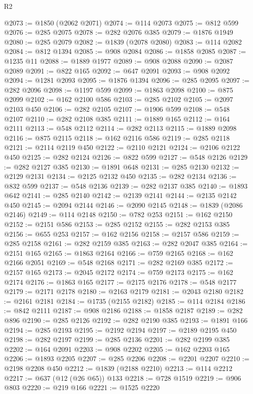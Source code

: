 \begin{lexlean}{R2}
\begin{coremodule}
@2073 := @1850 (@2062 @2071)
@2074 := @114 @2073
@2075 := @812 @599
@2076 := @285 @2075
@2078 := @282 @2076 @385
@2079 := @1876 @1949
@2080 := @285 @2079
@2082 := @1839 (@2078 @2080)
@2083 := @114 @2082
@2084 := @812 @1394
@2085 := @908 @2084
@2086 := @1858 @2085
@2087 := @1235 @11
@2088 := @1889 @1977
@2089 := @908 @2088
@2090 := @2087 @2089
@2091 := @822 @165
@2092 := @647 @2091
@2093 := @908 @2092
@2094 := @1281 @2093
@2095 := @1876 @1394
@2096 := @285 @2095
@2097 := @282 @2096
@2098 := @1197 @599
@2099 := @1863 @2098
@2100 := @875 @2099
@2102 := @162 @2100 @586
@2103 := @285 @2102
@2105 := @2097 @2103 @450
@2106 := @282 @2105
@2107 := @1906 @599
@2108 := @548 @2107
@2110 := @282 @2108 @385
@2111 := @1889 @165
@2112 := @164 @2111
@2113 := @548 @2112
@2114 := @282 @2113
@2115 := @1889 @2098
@2116 := @875 @2115
@2118 := @162 @2116 @586
@2119 := @285 @2118
@2121 := @2114 @2119 @450
@2122 := @2110 @2121
@2124 := @2106 @2122 @450
@2125 := @282 @2124
@2126 := @822 @599
@2127 := @548 @2126
@2129 := @282 @2127 @385
@2130 := @1891 @648
@2131 := @285 @2130
@2132 := @2129 @2131
@2134 := @2125 @2132 @450
@2135 := @282 @2134
@2136 := @832 @599
@2137 := @548 @2136
@2139 := @282 @2137 @385
@2140 := @1893 @642
@2141 := @285 @2140
@2142 := @2139 @2141
@2144 := @2135 @2142 @450
@2145 := @2094 @2144
@2146 := @2090 @2145
@2148 := @1839 (@2086 @2146)
@2149 := @114 @2148
@2150 := @782 @253
@2151 := @162 @2150
@2152 := @2151 @586
@2153 := @285 @2152
@2155 := @282 @2153 @385
@2156 := @655 @253
@2157 := @162 @2156
@2158 := @2157 @586
@2159 := @285 @2158
@2161 := @282 @2159 @385
@2163 := @282 @2047 @385
@2164 := @2151 @165
@2165 := @1863 @2164
@2166 := @759 @2165
@2168 := @162 @2166 @2051
@2169 := @548 @2168
@2171 := @282 @2169 @385
@2172 := @2157 @165
@2173 := @2045 @2172
@2174 := @759 @2173
@2175 := @162 @2174
@2176 := @1863 @165
@2177 := @2175 @2176
@2178 := @548 @2177
@2179 := @2171 @2178
@2180 := @2163 @2179
@2181 := @2043 @2180
@2182 := @2161 @2181
@2184 := @1735 (@2155 @2182)
@2185 := @114 @2184
@2186 := @842 @2111
@2187 := @908 @2186
@2188 := @1858 @2187
@2189 := @282 @896
@2190 := @285 @2126
@2192 := @282 @2190 @385
@2193 := @1891 @166
@2194 := @285 @2193
@2195 := @2192 @2194
@2197 := @2189 @2195 @450
@2198 := @282 @2197
@2199 := @285 @2136
@2201 := @282 @2199 @385
@2202 := @164 @2091
@2203 := @908 @2202
@2205 := @162 @2203 @165
@2206 := @1893 @2205
@2207 := @285 @2206
@2208 := @2201 @2207
@2210 := @2198 @2208 @450
@2212 := @1839 (@2188 @2210)
@2213 := @114 @2212
@2217 := @637 (@12 (@26 @65)) @133
@2218 := @728 @1519
@2219 := @906 @803
@2220 := @219 @166
@2221 := @1525 @2220

\end{coremodule}
\end{lexlean}
